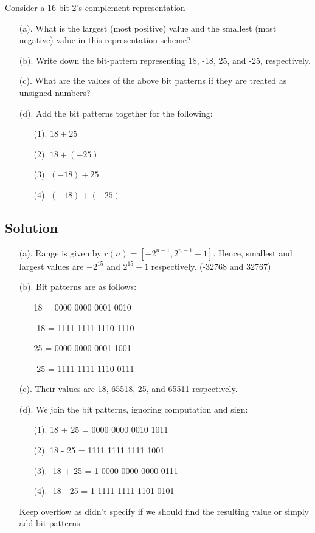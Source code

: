 \documentclass{article}
\begin{document}
Consider a 16-bit 2’s complement representation

\begin{enumerate}
    \item[(a).] What is the largest (most positive) value and the smallest (most negative) value in this representation scheme?
    \item[(b).] Write down the bit-pattern representing 18, -18, 25, and -25, respectively.
    \item[(c).] What are the values of the above bit patterns if they are treated as unsigned numbers?
    \item[(d).] Add the bit patterns together for the following:
        \begin{enumerate}
            \item[(1).] $18 + 25$
            \item[(2).] $18 + (-25)$
            \item[(3).] $(-18) + 25$
            \item[(4).] $(-18) + (-25)$
        \end{enumerate}
\end{enumerate}

\subsection*{Solution}


\begin{enumerate}
    \item[(a).] Range is given by $r(n) = [-2^{n-1}, 2^{n-1}-1]$. Hence, smallest and largest values are $-2^{15}$ and $2^{15}-1$ respectively. (-32768 and 32767)
    \item[(b).] Bit patterns are as follows:
        \begin{enumerate}
            \item[] 18 = 0000 0000 0001 0010
            \item[] -18 = 1111 1111 1110 1110
            \item[] 25 = 0000 0000 0001 1001
            \item[] -25 = 1111 1111 1110 0111
        \end{enumerate}
    \item[(c).] Their values are 18, 65518, 25, and 65511 respectively.
    \item[(d).] We join the bit patterns, ignoring computation and sign:
        \begin{enumerate}
            \item[(1).] 18 + 25 = 0000 0000 0010 1011
            \item[(2).] 18 - 25 = 1111 1111 1111 1001
            \item[(3).] -18 + 25 = 1 0000 0000 0000 0111
            \item[(4).] -18 - 25 = 1 1111 1111 1101 0101
        \end{enumerate}
        Keep overflow as didn't specify if we should find the resulting value or simply add bit patterns.
\end{enumerate}
\end{document}
